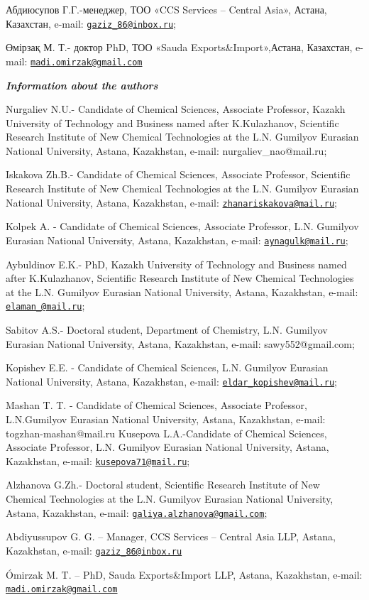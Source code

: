 \begin{authorinfo}
Абдиюсупов Г.Г.-менеджер, ТОО «CCS Services -- Central Asia», Астана,
Казахстан, e-mail:
\href{mailto:gaziz_86@inbox.ru}{\nolinkurl{gaziz\_86@inbox.ru}};

Өмірзақ М. Т.- доктор PhD, ТОО «Sauda Exports\&Import»,Астана,
Казахстан, e-mail:
\href{mailto:madi.omirzak@gmail.com}{\nolinkurl{madi.omirzak@gmail.com}}

\emph{{\bfseries Information about the authors}}

Nurgaliev N.U.- Candidate of Chemical Sciences, Associate Professor,
Kazakh University of Technology and Business named after K.Kulazhanov,
Scientific Research Institute of New Chemical Technologies at the L.N.
Gumilyov Eurasian National University, Astana, Kazakhstan, e-mail:
nurgaliev\_nao@mail.ru;

Iskakova Zh.B.- Candidate of Chemical Sciences, Associate Professor,
Scientific Research Institute of New Chemical Technologies at the L.N.
Gumilyov Eurasian National University, Astana, Kazakhstan, e-mail:
\href{mailto:zhanariskakova@mail.ru}{\nolinkurl{zhanariskakova@mail.ru}};

Kolpek A. - Candidate of Chemical Sciences, Associate Professor, L.N.
Gumilyov Eurasian National University, Astana, Kazakhstan, e-mail:
\href{mailto:aynagulk@mail.ru}{\nolinkurl{aynagulk@mail.ru}};

Aybuldinov E.K.- PhD, Kazakh University of Technology and Business named
after K.Kulazhanov, Scientific Research Institute of New Chemical
Technologies at the L.N. Gumilyov Eurasian National University, Astana,
Kazakhstan, e-mail:
\href{mailto:elaman_@mail.ru}{\nolinkurl{elaman\_@mail.ru}};

Sabitov A.S.- Doctoral student, Department of Chemistry, L.N. Gumilyov
Eurasian National University, Astana, Kazakhstan, e-mail:
sawy552@gmail.com;

Kopishev E.E. - Candidate of Chemical Sciences, L.N. Gumilyov Eurasian
National University, Astana, Kazakhstan, e-mail:
\href{mailto:eldar_kopishev@mail.ru}{\nolinkurl{eldar\_kopishev@mail.ru}};

Mashan T. T. - Candidate of Chemical Sciences, Associate Professor,
L.N.Gumilyov Eurasian National University, Astana, Kazakhstan, e-mail:
togzhan-mashan@mail.ru Kusepova L.A.-Candidate of Chemical Sciences,
Associate Professor, L.N. Gumilyov Eurasian National University, Astana,
Kazakhstan, e-mail:
\href{mailto:kusepova71@mail.ru}{\nolinkurl{kusepova71@mail.ru}};

Alzhanova G.Zh.- Doctoral student, Scientific Research Institute of New
Chemical Technologies at the L.N. Gumilyov Eurasian National University,
Astana, Kazakhstan, e-mail:
\href{mailto:galiya.alzhanova@gmail.com}{\nolinkurl{galiya.alzhanova@gmail.com}};

Abdiyussupov G. G. -- Manager, CCS Services -- Central Asia LLP, Astana,
Kazakhstan, e-mail:
\href{mailto:gaziz_86@inbox.ru}{\nolinkurl{gaziz\_86@inbox.ru}}

Ómirzak M. T. -- PhD, Sauda Exports\&Import LLP, Astana, Kazakhstan,
e-mail:
\href{mailto:madi.omirzak@gmail.com}{\nolinkurl{madi.omirzak@gmail.com}}\
\end{authorinfo}
